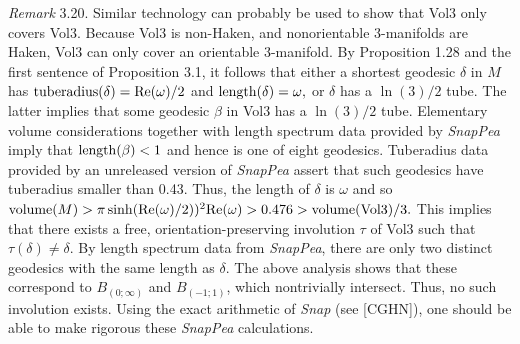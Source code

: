 {\it Remark} 3.20.  Similar technology can probably be used to show that Vol3 only covers Vol3.  Because Vol3 is
non-Haken, and nonorientable 3-manifolds are Haken, 
Vol3 can only cover an orientable 3-manifold.
By Proposition 1.28 and the first sentence of Proposition 3.1, it follows that either a shortest geodesic $\delta$ in $M$ has ${\rm tuberadius}(\delta) 
= {\rm Re}(\omega)/2$ and ${\rm length}(\delta) = \omega,$ or $\delta$ has a $\ln(3)/2$ tube.  The latter implies that some geodesic $\beta$ in Vol3 has a $\ln(3)/2$ tube.  Elementary volume considerations together with length spectrum data provided by {\it SnapPea} imply that ${\rm length}(\beta) < 1$ and hence is one of
eight geodesics.  Tuberadius data provided by an unreleased version of {\it SnapPea} assert that such geodesics
have  tuberadius smaller than 0.43.   Thus, the length of $\delta$ is $\omega$ and so 
${\rm volume}(M) > \pi \sinh({\rm Re}(\omega)/2))^2 {\rm Re}(\omega) > 
0.476 > {\rm volume}({\rm Vol3})/3.$  This implies that there exists a free, orientation-preserving involution $\tau$ of Vol3 such that $\tau(\delta) \ne \delta.$  By  length spectrum data from {\it SnapPea}, there are only two distinct geodesics with the same length as $\delta.$  The above analysis shows that these correspond to $ B_{(0;\infty)}$ and $ B_{(-1;1)}$, which nontrivially intersect.  Thus, no such involution exists.  Using the exact arithmetic of {\it Snap} (see [CGHN]), one should be able to make rigorous these {\it SnapPea} calculations.
 



